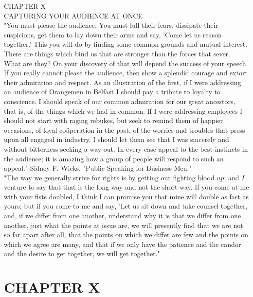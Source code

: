 \documentclass[10pt]{article}
\begin{document}
CHAPTER X\\
CAPTURING YOUR AUDIENCE AT ONCE\\
"You must please the audience. You must lull their fears, dissipate their suspicions, get them to lay down their arms and say, 'Come let us reason together.' This you will do by finding some common grounds and mutual interest. There are things which bind us that are stronger than the forces that sever. What are they? On your discovery of that will depend the success of your speech. If you really cannot please the audience, then show a splendid courage and extort their admiration and respect. As an illustration of the first, if I were addressing an audience of Orangemen in Belfast I should pay a tribute to loyalty to conscience. I should speak of our common admiration for our great ancestors, that is, of the things which we had in common. If I were addressing employees I should not start with raging rebukes, but seek to remind them of happier occasions, of loyal coüperation in the past, of the worries and troubles that press upon all engaged in industry. I should let them see that I was sincerely and without bitterness seeking a way out. In every case appeal to the best instincts in the audience; it is amazing how a group of people will respond to such an appeal."-Sidney F. Wicks, "Public Speaking for Business Men."\\
"The way we generally strive for rights is by getting our fighting blood $u p$; and $I$ venture to say that that is the long way and not the short way. If you come at me with your fists doubled, I think I can promise you that mine will double as fast as yours; but if you come to me and say, 'Let us sit down and take counsel together, and, if we differ from one another, understand why it is that we differ from one another, just what the points at issue are, we will presently find that we are not so far apart after all, that the points on which we differ are few and the points on which we agree are many, and that if we only have the patience and the candor and the desire to get together, we will get together."

\section*{CHAPTER X}
\end{document}

